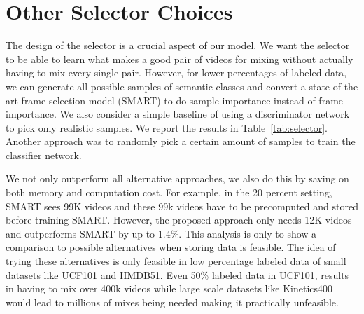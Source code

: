 \documentclass[runningheads]{llncs}
\begin{document}
\section{Other Selector Choices}
\label{selector}

The design of the selector is a crucial aspect of our model. We want the selector to be able to learn what makes a good pair of videos for mixing without actually having to mix every single pair.
However, for lower percentages of labeled data, we can generate all possible samples of semantic
classes and convert a state-of-the art frame selection model
(SMART) \cite{smart} to do sample importance instead of frame importance.
We also consider a simple baseline of using a discriminator network to pick only realistic samples. We report the results in Table~\ref{tab:selector}. Another approach was to randomly pick a certain amount of samples to train the classifier network. 

We not only outperform all alternative approaches, we also do this by saving on both memory and computation cost. For example, in the 20 percent setting, SMART sees
99K videos and these 99k videos have to be precomputed
and stored before training SMART. However, the proposed
approach only needs 12K videos and outperforms SMART
by up to 1.4\%. This analysis is only to show a comparison to possible alternatives when storing data is feasible. The idea of trying these alternatives is only
feasible in low percentage labeled data of small datasets like
UCF101 and HMDB51. Even 50\% labeled data in UCF101, results in having to mix over 400k videos while large scale datasets like Kinetics400 would lead to millions of mixes being needed making it practically unfeasible.  
\end{document}
